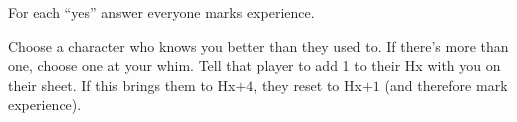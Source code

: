 For each ``yes'' answer everyone marks experience.

Choose a character who knows you better than they used to. If there's
more than one, choose one at your whim. Tell that player to add 1 to
their Hx with you on their sheet. If this brings them to Hx$+4$, they
reset to Hx$+1$ (and therefore mark experience).
